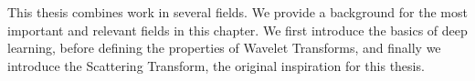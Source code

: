 This thesis combines work in several fields. We provide a background for the
most important and relevant fields in this chapter. We first introduce the
basics of deep learning, before defining the properties of Wavelet Transforms,
and finally we introduce the Scattering Transform, the original inspiration for
this thesis.
